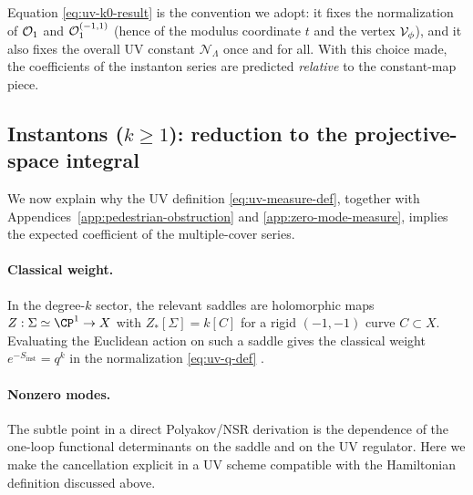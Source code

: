 \documentclass[12pt]{article}
\begin{document}
Equation \eqref{eq:uv-k0-result} is the convention we adopt: it fixes the
normalization of ${\cal O}_1$ and ${\cal O}_1^{(-1,1)}$ (hence of the modulus
coordinate $t$ and the vertex ${\cal V}_\phi$), and it also fixes the overall
UV constant $\mathcal{N}_\Lambda$ once and for all. With this choice made, the
coefficients of the instanton series are predicted \emph{relative} to the
constant-map piece.

\subsection{Instantons ($k\ge 1$): reduction to the projective-space integral}
We now explain why the UV definition \eqref{eq:uv-measure-def}, together with
Appendices~\ref{app:pedestrian-obstruction} and \ref{app:zero-mode-measure},
implies the expected coefficient of the multiple-cover series.

\paragraph{Classical weight.}
In the degree-$k$ sector, the relevant saddles are holomorphic maps
$Z:\Sigma\simeq\CP^1\to X$ with $Z_*[\Sigma]=k[C]$ for a rigid $(-1,-1)$ curve
$C\subset X$. Evaluating the Euclidean action on such a saddle gives the
classical weight $e^{-S_{\mathrm{inst}}}=q^k$ in the normalization
\eqref{eq:uv-q-def} \cite[Eq.~(19.184)]{Yin:FoundationsStringTheory}.

\paragraph{Nonzero modes.}
The subtle point in a direct Polyakov/NSR derivation is the dependence of the
one-loop functional determinants on the saddle and on the UV regulator. Here we
make the cancellation explicit in a UV scheme compatible with the Hamiltonian
definition discussed above.
\end{document}
